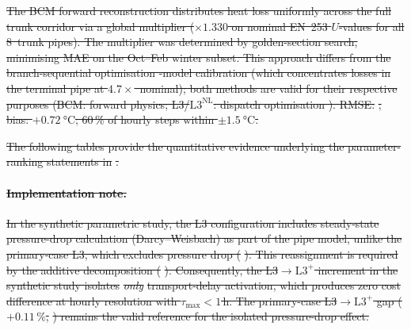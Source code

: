 \documentclass[a4paper,fleqn]{cas-sc} %
\providecommand{\DIFdel}[1]{{\protect\color{red}\sout{#1}}} %
\providecommand{\Lplus}{\ensuremath{\mathrm{L3^{+}}}}
\providecommand{\Lnl}{\ensuremath{\mathrm{L3^{\mathrm{NL}}}}}
\providecommand{\Cref}[1]{\ref{#1}}
\begin{document}

\DIFdel{The BCM forward reconstruction distributes heat loss uniformly
across the full }%
\DIFdel{trunk corridor via a global
multiplier (${\times}1.330$ on nominal EN~253 $U$-values for all
8~trunk pipes). The multiplier was determined by golden-section
search, minimising MAE on the
Oct--Feb winter subset.  This
approach differs from the branch-sequential optimisation -model
calibration (which concentrates losses in the terminal pipe at
$4.7{\times}$~nominal); both methods are valid for their
respective purposes (BCM: forward physics; L3/$\Lnl$: dispatch
optimisation ).  RMSE: }%
\DIFdel{; bias:
${+}\SI{0.72}{\celsius}$; 60\,\% of hourly steps within
${\pm}\SI{1.5}{\celsius}$.
}%


\DIFdel{The following tables provide the quantitative evidence underlying
the parameter-ranking statements in }%
\DIFdel{.
}%

\paragraph{\DIFdel{Implementation note.}}
\addtocounter{paragraph}{-1}%
\DIFdel{In the synthetic parametric study, the L3 configuration includes
steady-state pressure-drop calculation (Darcy--Weisbach) as part
of the pipe model, unlike the primary-case L3, which excludes
pressure drop (}%
\DIFdel{). This reassignment is
required by the additive decomposition
(}%
\DIFdel{).
Consequently, the L3$\to\Lplus$ increment in the synthetic study
isolates }\emph{\DIFdel{only}} %
\DIFdel{transport-delay activation, which produces
zero cost difference at hourly resolution with
$\tau_{\max} < 1$\,h. The primary-case L3$\to\Lplus$ gap
($+0.11\,\%$, }%
\DIFdel{) remains the valid
reference for the isolated pressure-drop effect.
}%
\end{document}
